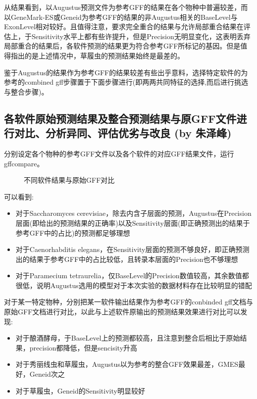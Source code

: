 \documentclass[12pt]{ctexart}
\begin{document}
从结果看到，以Augustus预测文件为参考GFF的结果在各个物种中普遍较差，而以GeneMark-ES或Geneid为参考GFF的结果的非Augustus相关的BaseLevel与ExonLevel相对较好。且值得注意，要求完全重合的结果与允许局部重合结果在评估上，于Sensitivity水平上都有些许提升，但是Precision无明显变化，这表明丢弃局部重合的结果后，各软件预测的结果更为符合参考GFF所标记的基因。但是值得指出的是上述情况中，草履虫的预测结果始终是最差的。

鉴于Augustus的结果作为参考GFF的结果较差有些出乎意料，选择特定软件的为参考的combined gff步骤置于下面步骤进行(即两两共同特征的选择,而后进行挑选与整合步骤)。

\subsection{各软件原始预测结果及整合预测结果与原GFF文件进行对比、分析异同、评估优劣与改良 (by 朱泽峰)}

分别设定各个物种的参考GFF文件以及各个软件的对应GFF结果文件，运行gffcompare。

\begin{figure}[htbp]
\centering
{}
\quad
{}
\quad
{}
\caption{不同软件结果与原始GFF对比}
\end{figure}

可以看到:

\begin{itemize}
    \item 对于Saccharomyces cerevisiae，除去内含子层面的预测，Augustus在Precision层面(即给出的预测结果的正确率)以及Sensitivity层面(即正确预测出的结果于参考GFF中的占比)的预测都足够理想
    \item 对于Caenorhabditis elegans，在Sensitivity层面的预测不够良好，即正确预测出的结果于参考GFF中的占比较低，且转录本层面的Precision也不够理想
    \item 对于Paramecium tetraurelia，仅BaseLevel的Precision数值较高，其余数值都很低，说明Augustus选用的模型对于本次实验的数据材料存在比较明显的错配
\end{itemize}

对于某一特定物种，分别把某一软件输出结果作为参考GFF的conbinded gff文档与原始GFF文档进行对比，以此与上述软件原输出的预测结果效果进行对比可以发现:

\begin{itemize}
    \item 对于酿酒酵母，于BaseLevel上的预测都较高，且注意到整合后相比于原始结果，precision都降低，但是sencisity升高
    \item 对于秀丽线虫和草履虫，Augustus以为参考的整合GFF效果最差，GMES最好，Geneid次之
    \item 对于草履虫，Geneid的Sensitivity明显较好
\end{itemize}
\end{document}
